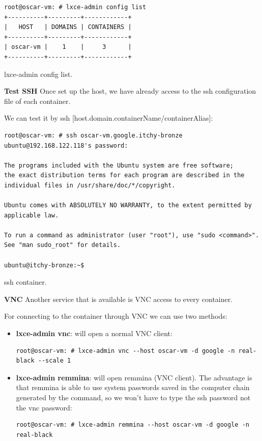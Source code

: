 \begin{listing}[H]
\begin{verbatim}
root@oscar-vm: # lxce-admin config list
+----------+---------+------------+
|   HOST   | DOMAINS | CONTAINERS |
+----------+---------+------------+
| oscar-vm |    1    |     3      |
+----------+---------+------------+
\end{verbatim}
\caption[lxce-admin config list]{\footnotesize{lxce-admin config list.}}
\end{listing}

\newpage
\textbf{Test SSH}
Once set up the host, we have already access to the ssh configuration file of each container.

We can test it by ssh [host.domain.containerName/containerAlias]:
\begin{listing}[H]
\begin{verbatim}
root@oscar-vm: # ssh oscar-vm.google.itchy-bronze
ubuntu@192.168.122.118's password:

The programs included with the Ubuntu system are free software;
the exact distribution terms for each program are described in the
individual files in /usr/share/doc/*/copyright.

Ubuntu comes with ABSOLUTELY NO WARRANTY, to the extent permitted by
applicable law.

To run a command as administrator (user "root"), use "sudo <command>".
See "man sudo_root" for details.

ubuntu@itchy-bronze:~$
\end{verbatim}
\caption[ssh container]{\footnotesize{ssh container.}}
\end{listing}

\textbf{VNC}
Another service that is available is VNC access to every container.

For connecting to the container through VNC we can use two methods:
\begin{itemize}
	\item{\textbf{lxce-admin vnc}: will open a normal VNC client:}
\begin{verbatim}
root@oscar-vm: # lxce-admin vnc --host oscar-vm -d google -n real-black --scale 1
\end{verbatim}
	\item{\textbf{lxce-admin remmina}: will open remmina (VNC client). The advantage is that remmina is able to use system passwords saved in the computer chain generated by the command, so we won't have to type the ssh password not the vnc password:}
\begin{verbatim}
root@oscar-vm: # lxce-admin remmina --host oscar-vm -d google -n real-black
\end{verbatim}
\end{itemize}


